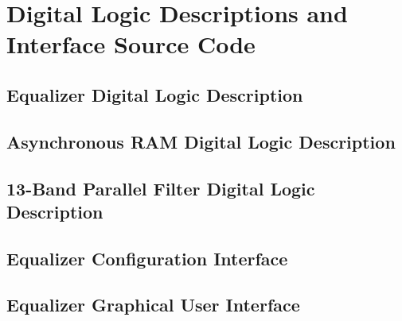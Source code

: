 \documentclass[journal]{IEEEtran} %
\begin{document}
\newpage
\onecolumn
\section{Digital Logic Descriptions and Interface Source Code}
\subsection{Equalizer Digital Logic Description}

\clearpage
\subsection{Asynchronous RAM Digital Logic Description}

\clearpage
\subsection{13-Band Parallel Filter Digital Logic Description}

\clearpage
\subsection{Equalizer Configuration Interface}

\subsection{Equalizer Graphical User Interface} 

\end{document}
